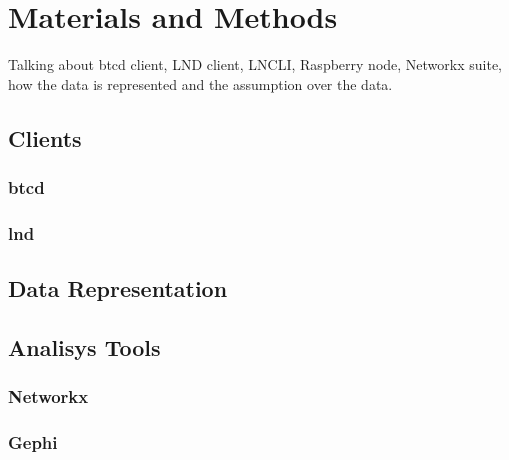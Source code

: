 
	\chapter{Materials and Methods}
	Talking about btcd client, LND client, LNCLI, Raspberry node, Networkx suite, how the data is represented and the assumption over the data.
	\section{Clients}
	\subsection{btcd}
	\subsection{lnd}
	\section{Data Representation}
	\section{Analisys Tools}
	\subsection{Networkx}
	\subsection{Gephi}
